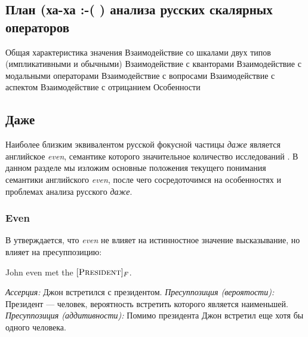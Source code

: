 \documentclass[a4paper, titlepage, 12pt]{article}
\begin{document}
\subsection{План (ха-ха :-( ) анализа русских скалярных операторов} \label{additivityClassification}

\begin{exe}
    \ex \begin{xlist}
        \ex Общая характеристика значения
        \ex Взаимодействие со шкалами двух типов (импликативными и обычными)
        \ex Взаимодействие с кванторами
        \ex Взаимодействие с модальными операторами
        \ex Взаимодействие с вопросами
        \ex Взаимодействие с аспектом
        \ex Взаимодействие с отрицанием
        \ex Особенности
    \end{xlist}
\end{exe}

\subsection{Даже}

Наиболее близким эквивалентом русской фокусной частицы \textit{даже} является английское \textit{even}, семантике которого значительное количество исследований \citep{horn1969presuppositional,stalnaker1974pragmatic,rullmann1997even,iatridou2016our,kay1990even}. В данном разделе мы изложим основные положения текущего понимания семантики английского \textit{even}, после чего сосредоточимся на особенностях и проблемах анализа русского \textit{даже}.

\subsubsection{Even}

В \citep{horn1969presuppositional} утверждается, что \textit{even} не влияет на истинностное значение высказывание, но влияет на пресуппозицию:

\begin{exe}
    \ex \label{onlyAssPres} John even met the $ [\textsc{President}]_F $. \begin{xlist}
        \ex \textit{Ассерция:} Джон встретился с президентом.
        \ex \textit{Пресуппозиция (вероятости):} Президент --- человек, вероятность встретить которого является наименьшей.
        \ex \textit{Пресуппозиция (аддитивности):} Помимо президента Джон встретил еще хотя бы одного человека.
    \end{xlist}
\end{exe}
\end{document}
